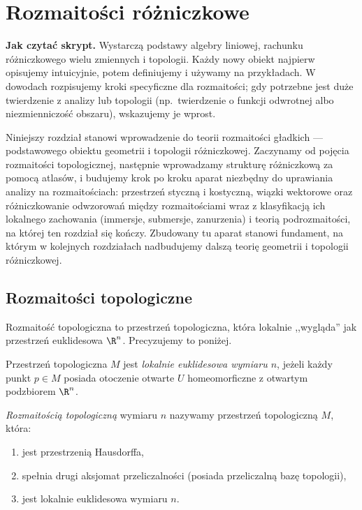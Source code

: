 \chapter{Rozmaitości różniczkowe}
\providecommand{\atlasref}[2]{#2}
\label{ch:rozmaitosci}

\noindent\textbf{Jak czytać skrypt.}
Wystarczą podstawy algebry liniowej, rachunku różniczkowego
wielu zmiennych i topologii. Każdy nowy obiekt najpierw
opisujemy intuicyjnie, potem definiujemy i używamy na
przykładach. W dowodach rozpisujemy kroki specyficzne dla
rozmaitości; gdy potrzebne jest duże twierdzenie z analizy
lub topologii (np.\ twierdzenie o funkcji odwrotnej albo
niezmienniczość obszaru), wskazujemy je wprost.

Niniejszy rozdział stanowi wprowadzenie do teorii rozmaitości gładkich — podstawowego
obiektu geometrii i topologii różniczkowej. Zaczynamy od pojęcia rozmaitości topologicznej,
następnie wprowadzamy strukturę różniczkową za pomocą atlasów, i budujemy krok po kroku
aparat niezbędny do uprawiania analizy na rozmaitościach: przestrzeń styczną i kostyczną,
wiązki wektorowe oraz różniczkowanie odwzorowań między rozmaitościami wraz z klasyfikacją
ich lokalnego zachowania (immersje, submersje, zanurzenia) i teorią podrozmaitości, na
której ten rozdział się kończy. Zbudowany tu aparat stanowi fundament, na którym w
kolejnych rozdziałach nadbudujemy dalszą teorię geometrii i topologii różniczkowej.



\section{Rozmaitości topologiczne}

Rozmaitość topologiczna to przestrzeń topologiczna, która lokalnie ,,wygląda'' jak
przestrzeń euklidesowa $\R^n$. Precyzujemy to poniżej.

\begin{definicja}
Przestrzeń topologiczna $M$ jest \emph{lokalnie euklidesowa wymiaru $n$}, jeżeli każdy
punkt $p\in M$ posiada otoczenie otwarte $U$ homeomorficzne z otwartym podzbiorem $\R^n$.
\end{definicja}

\begin{definicja}
\emph{Rozmaitością topologiczną} wymiaru $n$ nazywamy przestrzeń topologiczną $M$, która:
\begin{enumerate}[label=(\roman*)]
\item jest przestrzenią Hausdorffa,
\item spełnia drugi aksjomat przeliczalności (posiada przeliczalną bazę topologii),
\item jest lokalnie euklidesowa wymiaru $n$.
\end{enumerate}
\end{definicja}


